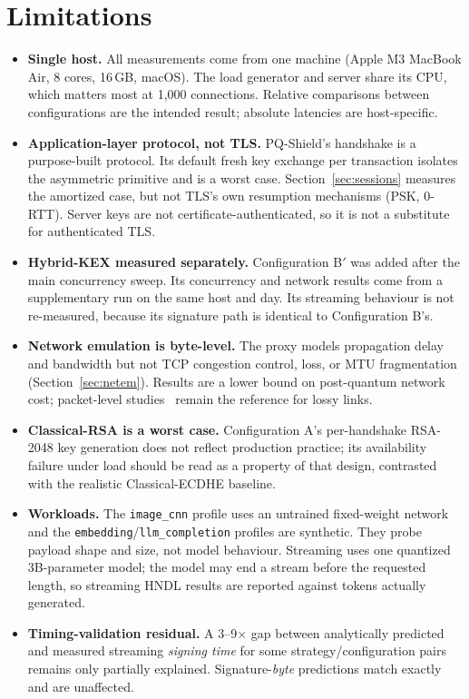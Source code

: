 \section{Limitations}
\begin{itemize}
  \item \textbf{Single host.} All measurements come from one machine
  (Apple M3 MacBook Air, 8 cores, 16\,GB, macOS). The load generator and server share its CPU,
  which matters most at 1,000 connections. Relative comparisons between configurations are the
  intended result; absolute latencies are host-specific.
  \item \textbf{Application-layer protocol, not TLS.} PQ-Shield's handshake is a purpose-built
  protocol. Its default fresh key exchange per transaction isolates the asymmetric primitive and is
  a worst case. Section~\ref{sec:sessions} measures the amortized case, but not TLS's own
  resumption mechanisms (PSK, 0-RTT). Server keys are not certificate-authenticated, so it is not a
  substitute for authenticated TLS.
  \item \textbf{Hybrid-KEX measured separately.} Configuration B$'$ was added after the main
  concurrency sweep. Its concurrency and network results come from a supplementary run on the same
  host and day. Its streaming behaviour is not re-measured, because its signature path is identical
  to Configuration B's.
  \item \textbf{Network emulation is byte-level.} The proxy models propagation delay and bandwidth
  but not TCP congestion control, loss, or MTU fragmentation (Section~\ref{sec:netem}). Results are
  a lower bound on post-quantum network cost; packet-level studies~\cite{paquin2020benchmarking,
  sikeridis2020authentication} remain the reference for lossy links.
  \item \textbf{Classical-RSA is a worst case.} Configuration A's per-handshake RSA-2048 key
  generation does not reflect production practice; its availability failure under load should be
  read as a property of that design, contrasted with the realistic Classical-ECDHE baseline.
  \item \textbf{Workloads.} The \texttt{image\_cnn} profile uses an untrained fixed-weight network
  and the \texttt{embedding}/\texttt{llm\_completion} profiles are synthetic. They probe payload
  shape and size, not model behaviour. Streaming uses one quantized 3B-parameter model; the model
  may end a stream before the requested length, so streaming HNDL results are reported against
  tokens actually generated.
  \item \textbf{Timing-validation residual.} A 3--9$\times$ gap between analytically predicted and
  measured streaming \emph{signing time} for some strategy/configuration pairs remains only
  partially explained. Signature-\emph{byte} predictions match exactly and are unaffected.
\end{itemize}
